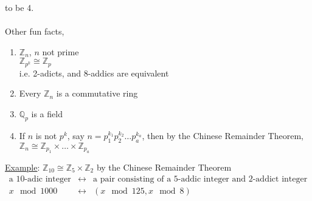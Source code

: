   to be 4.\\\\
  Other fun facts,
  \begin{enumerate}
    \item $\mathbb{Z}_n$, $n$ not prime\\
     $\mathbb{Z}_{p^k} \cong \mathbb{Z}_p$\\
     i.e. 2-adicts, and 8-addics are equivalent
     \item Every $\mathbb{Z}_n$ is a commutative ring
     \item $\mathbb{Q}_p$ is a field
     \item If $n$ is not $p^k$, say $n = p_1^{k_1}p_2^{k_2}\ldots p_a^{k_a}$,
     then by the Chinese Remainder Theorem, $\mathbb{Z}_n
     \cong \mathbb{Z}_{p_1} \times \ldots \times \mathbb{Z}_{p_a}$
  \end{enumerate}

  \underline{Example}: $\mathbb{Z}_{10} \cong \mathbb{Z}_5 \times \mathbb{Z}_2$
  by the Chinese Remainder Theorem\\
  \begin{eqnarray*}
  \text{a 10-adic integer} &\leftrightarrow& 
  \text{a pair consisting of a 5-addic integer
  and 2-addict integer}\\
  x \mod 1000 &\leftrightarrow& (x \mod 125, x \mod 8)
  \end{eqnarray*}

